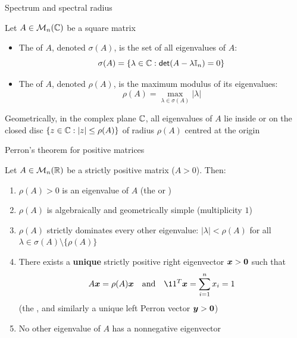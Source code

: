 \documentclass[aspectratio=169]{beamer}\usepackage[]{graphicx}\usepackage[]{xcolor}
\begin{document}

\begin{frame}{Spectrum and spectral radius}
\begin{importantdefinition}
Let $A \in \mathcal{M}_n(\mathbb{C})$ be a square matrix
\begin{itemize}
\item The  of $A$, denoted $\sigma(A)$, is the set of all eigenvalues of $A$:
\[
\sigma(A) = \{\lambda \in \mathbb{C} : \mathsf{det}(A - \lambda \mathbb{I}_n) = 0\}
\]
\item The  of $A$, denoted $\rho(A)$, is the maximum modulus of its eigenvalues:
\[
\rho(A) = \max_{\lambda \in \sigma(A)} |\lambda|
\]
\end{itemize}
\end{importantdefinition}
\vfill
Geometrically, in the complex plane $\mathbb{C}$, all eigenvalues of $A$ lie inside or on the closed disc $\{z \in \mathbb{C} : |z| \le \rho(A)\}$ of radius $\rho(A)$ centred at the origin
\end{frame}

\begin{frame}{Perron's theorem for positive matrices}
\begin{theorem}
\label{th:perron}
Let $A \in \mathcal{M}_n(\mathbb{R})$ be a strictly positive matrix ($A > 0$). Then:
\begin{enumerate}
\item $\rho(A) > 0$ is an eigenvalue of $A$ (the  or )
\item $\rho(A)$ is algebraically and geometrically simple (multiplicity $1$)
\item $\rho(A)$ strictly dominates every other eigenvalue: $|\lambda| < \rho(A)$ for all $\lambda \in \sigma(A) \setminus \{\rho(A)\}$
\item There exists a \textbf{unique} strictly positive right eigenvector $\bx > \b0$ such that
\[
A\bx = \rho(A)\bx \quad \text{and} \quad \11^T\bx = \sum_{i=1}^n x_i = 1
\]
(the , and similarly a unique left Perron vector $\by > \b0$)
\item No other eigenvalue of $A$ has a nonnegative eigenvector
\end{enumerate}
\end{theorem}
\end{frame}
\end{document}
